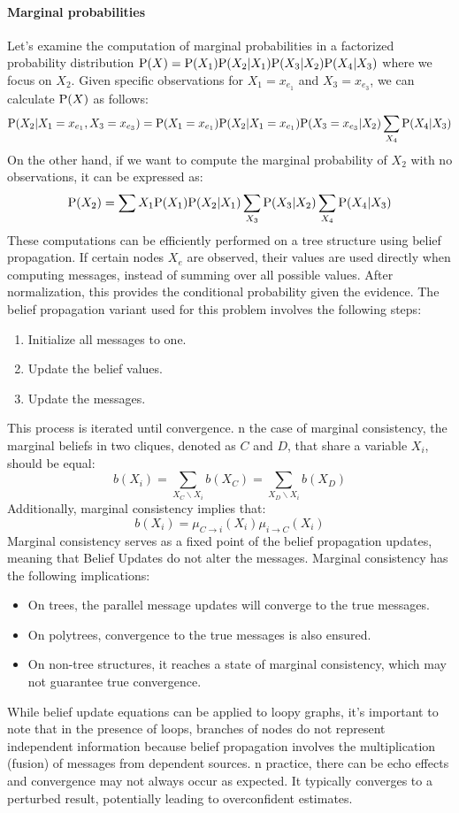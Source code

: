 \paragraph*{Marginal probabilities}
Let's examine the computation of marginal probabilities in a factorized probability distribution $\textnormal{P}(X)=\textnormal{P}( X_1) \textnormal{P} (X_2|X_1) \textnormal{P} (X_3|X_2) \textnormal{P} (X_4|X_3)$ where we focus on $X_2$. 
Given specific observations for $X_1=x_{e_1}$ and $X_3=x_{e_3}$, we can calculate $\textnormal{P}(X)$ as follows:
\[\textnormal{P} (X_2|X_1 = x_{e_1}, X_3 = x_{e_3})= \textnormal{P} (X_1 = x_{e_1})\textnormal{P} (X_2|X_1 = x_{e_1})\textnormal{P} (X_3 = x_{e_3}|X_2) \sum_{X_4}\textnormal{P} (X_4|X_3)\]
On the other hand, if we want to compute the marginal probability of $X_2$ with no observations, it can be expressed as:
\[\textnormal{P}(X_2)=\sum{X_1}\textnormal{P}(X_1)\textnormal{P}(X_2|X_1)\sum_{X_3}\textnormal{P}(X_3|X_2)\sum_{X_4}\textnormal{P}(X_4|X_3)\]
These computations can be efficiently performed on a tree structure using belief propagation. 
If certain nodes $X_e$ are observed, their values are used directly when computing messages, instead of summing over all possible values.
After normalization, this provides the conditional probability given the evidence.
The belief propagation variant used for this problem involves the following steps:
\begin{enumerate}
    \item Initialize all messages to one.
    \item Update the belief values.
    \item Update the messages.
\end{enumerate}
This process is iterated until convergence.
n the case of marginal consistency, the marginal beliefs in two cliques, denoted as $C$ and $D$, that share a variable $X_i$, should be equal:
\[b(X_i)=\sum_{X_C \backslash X_i}b(X_C)=\sum_{X_D \backslash X_i}b(X_D)\]
Additionally, marginal consistency implies that:
\[b(X_i)=\mu_{C \rightarrow i}(X_i)\mu_{i \rightarrow C}(X_i)\]
Marginal consistency serves as a fixed point of the belief propagation updates, meaning that Belief Updates do not alter the messages.
Marginal consistency has the following implications:
\begin{itemize}
    \item On trees, the parallel message updates will converge to the true messages.
    \item On polytrees, convergence to the true messages is also ensured.
    \item On non-tree structures, it reaches a state of marginal consistency, which may not guarantee true convergence.
\end{itemize}
While belief update equations can be applied to loopy graphs, it's important to note that in the presence of loops, branches of nodes do not represent independent information because belief propagation involves the multiplication (fusion) of messages from dependent sources.
n practice, there can be echo effects and convergence may not always occur as expected. 
It typically converges to a perturbed result, potentially leading to overconfident estimates.